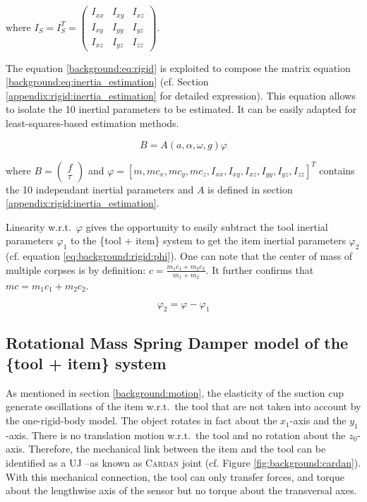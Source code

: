 \documentclass[/home/francois/latex/report/main.tex]{subfiles}
\begin{document}
where $I_S = I_S^T =
\begin{pmatrix}
 I_{xx} & I_{xy} & I_{xz} \\
 I_{xy} & I_{yy} & I_{yz} \\
 I_{xz} & I_{yz} & I_{zz}
\end{pmatrix}
$.

The equation \ref{background:eq:rigid} is exploited to compose the matrix equation \ref{background:eq:inertia_estimation} (cf. Section \ref{appendix:rigid:inertia_estimation} for detailed expression). This equation allows to isolate the 10 inertial parameters to be estimated. It can be easily adapted for least-squares-based estimation methods.

\begin{equation}
  \label{background:eq:inertia_estimation}
B = A(a, \alpha, \omega, g) \varphi
\end{equation}

where $B =  \begin{pmatrix} f \\ \tau \end{pmatrix}$ and $\varphi = [m, m c_x, m c_y, m c_z, I_{xx}, I_{xy}, I_{xz}, I_{yy}, I_{yz}, I_{zz}]^T$ contains the 10 independant inertial parameters and $A$ is defined in section \ref{appendix:rigid:inertia_estimation}.

Linearity w.r.t.\ $\varphi$ gives the opportunity to easily subtract the tool inertial parameters $\varphi_1$ to the \{tool + item\} system to get the item inertial parameters $\varphi_2$ (cf. equation \ref{eq:background:rigid:phi}). One can note that the center of mass of multiple corpses is by definition: $c = \frac{m_1 c_1 + m_2 c_2}{m_1 + m_2}$. It further confirms that $mc = m_1 c_1 + m_2 c_2$.

\begin{equation}
  \label{eq:background:rigid:phi}
  \varphi_2 = \varphi - \varphi_{1}
\end{equation}


\subsection{Rotational Mass Spring Damper model of the \{tool + item\} system}
\label{section:background:rmsd}

As mentioned in section \ref{background:motion}, the elasticity of the suction cup generate oscillations of the item w.r.t.\ the tool that are not taken into account by the one-rigid-body model. The object rotates in fact about the $x_1$-axis and the $y_1$-axis. There is no translation motion w.r.t.\ the tool and no rotation about the $z_0$-axis. Therefore, the mechanical link between the item and the tool can be identified as a \ac{UJ} –as known as \textsc{Cardan} joint (cf. Figure \ref{fig:background:cardan}). With this mechanical connection, the tool can only transfer forces, and torque about the lengthwise axis of the sensor but no torque about the transversal axes.
\end{document}
